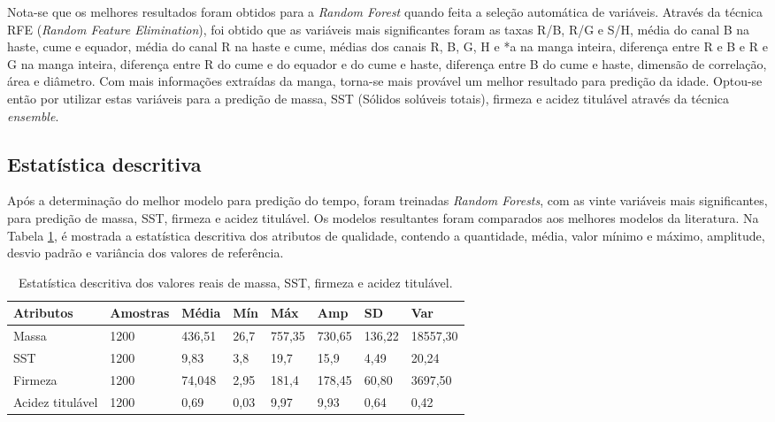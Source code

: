 Nota-se que os melhores resultados foram obtidos para a \textit{Random Forest} quando feita a seleção automática de variáveis. Através da técnica RFE (\textit{Random Feature Elimination}), foi obtido que as variáveis mais significantes foram as taxas R/B, R/G e S/H, média do canal B na haste, cume e equador, média do canal R na haste e cume, médias dos canais R, B, G, H e *a na manga inteira, diferença entre R e B e R e G na manga inteira, diferença entre R do cume e do equador e do cume e haste, diferença entre B do cume e haste, dimensão de correlação, área e diâmetro. Com mais informações extraídas da manga, torna-se mais provável um melhor resultado para predição da idade. Optou-se então por utilizar estas variáveis para a predição de massa, SST (Sólidos solúveis totais), firmeza e acidez titulável através da técnica \textit{ensemble}. 

\subsection{Estatística descritiva}

Após a determinação do melhor modelo para predição do tempo, foram treinadas \textit{Random Forests}, com as vinte variáveis mais significantes, para predição de massa, SST, firmeza e acidez titulável. Os modelos resultantes foram comparados aos melhores modelos da literatura. Na Tabela \ref{tbl:stats}, é mostrada a estatística descritiva dos atributos de qualidade, contendo a quantidade, média, valor mínimo e máximo, amplitude, desvio padrão e variância dos valores de referência.

\begin{table}[H]
\centering
\caption{Estatística descritiva dos valores reais de massa, SST, firmeza e acidez titulável.}\label{tbl:stats}
\begin{tabular}{llllllll}
\hline
Atributos & Amostras & M\'edia & M\'in & M\'ax & Amp & SD & Var   \\
\hline
Massa   & 1200 & 436,51  &   26,7  &   757,35  &  730,65   &  136,22   &  18557,30 \\
SST     & 1200 & 9,83    &   3,8   &   19,7    &  15,9     &  4,49     &  20,24 \\
Firmeza & 1200 & 74,048  &   2,95  &   181,4   & 178,45    & 60,80     & 3697,50 \\ 
Acidez titulável  & 1200 & 0,69    &   0,03  &   9,97    & 9,93      & 0,64      & 0,42 \\
\hline
\end{tabular}
\end{table}

